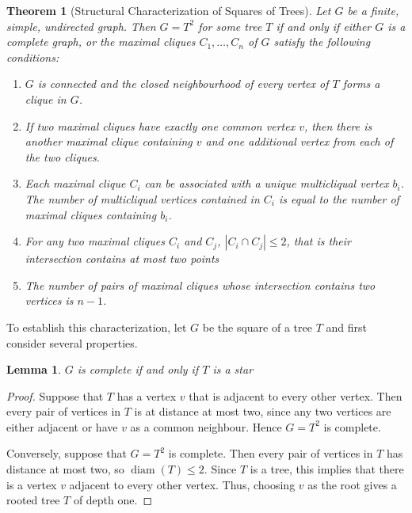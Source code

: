\documentclass[11pt]{report}
\newtheorem{theorem}{Theorem}
\newtheorem{lemma}{Lemma}
\begin{document}
\begin{theorem}[Structural Characterization of Squares of Trees] \label{theorem::structural_characterization_trees}
  Let $G$ be a finite, simple, undirected graph. Then $G = T^2$ for some tree $T$ if and only if either $G$ is a complete graph, or the maximal cliques $C_1, \ldots, C_n$ of $G$ satisfy the following conditions:
  \begin{enumerate}[label=(\roman*)]
    \item\label{characterization::1} $G$ is connected and the closed neighbourhood of every vertex of $T$ forms a clique in $G$.
    \item\label{characterization::2} If two maximal cliques have exactly one common vertex $v$, then there is another maximal clique containing $v$ and one additional vertex from each of the two cliques.
    \item\label{characterization::3} Each maximal clique $C_i$ can be associated with a unique multicliqual vertex $b_i$. The number of multicliqual vertices contained in $C_i$ is equal to the number of maximal cliques containing $b_i$.
    \item\label{characterization::4} For any two maximal cliques $C_i$ and $C_j$, $|C_i \cap C_j| \leq 2$, that is their intersection contains at most two points 
    \item\label{characterization::5} The number of pairs of maximal cliques whose intersection contains two vertices is $n-1$.
  \end{enumerate}
\end{theorem}

To establish this characterization, let $G$ be the square of a tree $T$ and first consider several properties.

\begin{lemma}\label{lemma::1}
  $G$ is complete if and only if $T$ is a star
\end{lemma}
\begin{proof}
  Suppose that $T$ has a vertex $v$ that is adjacent to every other vertex. Then every pair of vertices in $T$ is at distance at most two, since any two vertices are either adjacent or have $v$ as a common neighbour. Hence $G = T^2$ is complete.

  Conversely, suppose that $G = T^2$ is complete. Then every pair of vertices in $T$ has distance at most two, so $\operatorname{diam}(T) \leq 2$. Since $T$ is a tree, this implies that there is a vertex $v$ adjacent to every other vertex. Thus, choosing $v$ as the root gives a rooted tree $T$ of depth one.
\end{proof}
\end{document}
